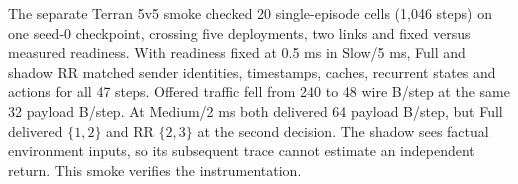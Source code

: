 \documentclass[11pt,a4paper]{article}
\begin{document}
The separate Terran 5v5 smoke checked 20 single-episode cells (1,046 steps) on one seed-0 checkpoint, crossing five deployments, two links and fixed versus measured readiness. With readiness fixed at 0.5 ms in Slow/5 ms, Full and shadow RR matched sender identities, timestamps, caches, recurrent states and actions for all 47 steps. Offered traffic fell from 240 to 48 wire B/step at the same 32 payload B/step. At Medium/2 ms both delivered 64 payload B/step, but Full delivered $\{1,2\}$ and RR $\{2,3\}$ at the second decision. The shadow sees factual environment inputs, so its subsequent trace cannot estimate an independent return. This smoke verifies the instrumentation.
\end{document}
